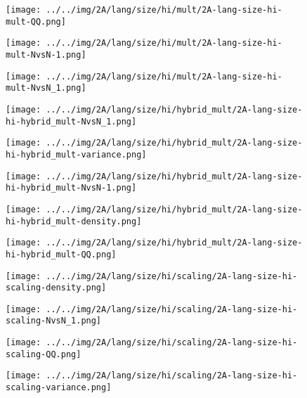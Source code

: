 \begin{figure}[H]
\centering	\texttt{[image: ../../img/2A/lang/size/hi/mult/2A-lang-size-hi-mult-QQ.png]}
\end{figure}
\begin{figure}[H]
\centering	\texttt{[image: ../../img/2A/lang/size/hi/mult/2A-lang-size-hi-mult-NvsN-1.png]}
\end{figure}
\begin{figure}[H]
\centering	\texttt{[image: ../../img/2A/lang/size/hi/mult/2A-lang-size-hi-mult-NvsN\_1.png]}
\end{figure}
\begin{figure}[H]
\centering	\texttt{[image: ../../img/2A/lang/size/hi/hybrid\_mult/2A-lang-size-hi-hybrid\_mult-NvsN\_1.png]}
\end{figure}
\begin{figure}[H]
\centering	\texttt{[image: ../../img/2A/lang/size/hi/hybrid\_mult/2A-lang-size-hi-hybrid\_mult-variance.png]}
\end{figure}
\begin{figure}[H]
\centering	\texttt{[image: ../../img/2A/lang/size/hi/hybrid\_mult/2A-lang-size-hi-hybrid\_mult-NvsN-1.png]}
\end{figure}
\begin{figure}[H]
\centering	\texttt{[image: ../../img/2A/lang/size/hi/hybrid\_mult/2A-lang-size-hi-hybrid\_mult-density.png]}
\end{figure}
\begin{figure}[H]
\centering	\texttt{[image: ../../img/2A/lang/size/hi/hybrid\_mult/2A-lang-size-hi-hybrid\_mult-QQ.png]}
\end{figure}
\begin{figure}[H]
\centering	\texttt{[image: ../../img/2A/lang/size/hi/scaling/2A-lang-size-hi-scaling-density.png]}
\end{figure}
\begin{figure}[H]
\centering	\texttt{[image: ../../img/2A/lang/size/hi/scaling/2A-lang-size-hi-scaling-NvsN\_1.png]}
\end{figure}
\begin{figure}[H]
\centering	\texttt{[image: ../../img/2A/lang/size/hi/scaling/2A-lang-size-hi-scaling-QQ.png]}
\end{figure}
\begin{figure}[H]
\centering	\texttt{[image: ../../img/2A/lang/size/hi/scaling/2A-lang-size-hi-scaling-variance.png]}
\end{figure}
